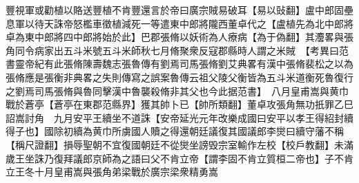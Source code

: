 豐視軍或勸植以賂送豐植不肯豐還言於帝曰廣宗賊易破耳【易以䜴翻】盧中郎固壘息軍以待天誅帝怒檻車徵植減死一等遣東中郎將隴西董卓代之【盧植先為北中郎將卓為東中郎將四中郎將始於此】巴郡張脩以妖術為人療病【為于偽翻】其灋畧與張角同令病家出五斗米號五斗米師秋七月脩聚衆反寇郡縣時人謂之米賊　【考異曰范書靈帝紀有此張脩陳壽魏志張魯傳有劉焉司馬張脩劉艾典畧有漢中張脩裴松之以為張脩應是張衡非典畧之失則傳寫之誤案魯傳云祖父陵父衡皆為五斗米道衡死魯復行之劉焉司馬張脩與魯同擊漢中魯襲殺脩非其父也今此据范書】　八月皇甫嵩與黄巾戰於蒼亭【蒼亭在東郡范縣界】獲其帥卜已【帥所類翻】董卓攻張角無功扺罪乙巳詔嵩討角　九月安平王續坐不道誅【安帝延光元年改樂成國曰安平以孝王得紹封續得子也】國除初續為黄巾所虜國人贖之得還朝廷議復其國議郎李爕曰續守藩不稱【稱尺證翻】損辱聖朝不宜復國朝廷不從爕坐謗毁宗室輸作左校【校戶教翻】未滿歲王坐誅乃復拜議郎京師為之語曰父不肯立帝【謂李固不肯立質桓二帝也】子不肯立王冬十月皇甫嵩與張角弟梁戰於廣宗梁衆精勇嵩


